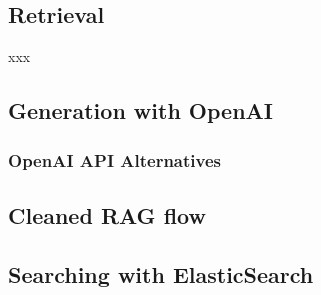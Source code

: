\subsection{Retrieval}
xxx
\subsection{Generation with OpenAI}

\subsubsection{OpenAI API Alternatives}

\subsection{Cleaned RAG flow}

\subsection{Searching with ElasticSearch}